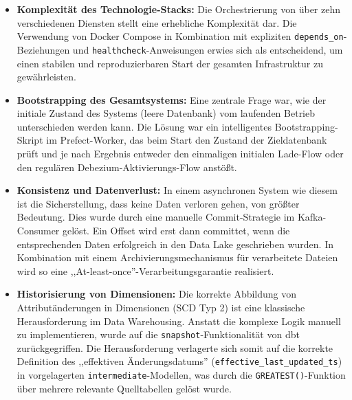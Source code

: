 \documentclass[
    12pt,               
    a4paper,        
    ngerman            
]{scrartcl}
\begin{document}
\begin{itemize}
    \item \textbf{Komplexität des Technologie-Stacks:} Die Orchestrierung von über zehn verschiedenen Diensten stellt eine erhebliche Komplexität dar. Die Verwendung von Docker Compose in Kombination mit expliziten \texttt{depends\_on}-Beziehungen und \texttt{healthcheck}-Anweisungen erwies sich als entscheidend, um einen stabilen und reproduzierbaren Start der gesamten Infrastruktur zu gewährleisten.

    \item \textbf{Bootstrapping des Gesamtsystems:} Eine zentrale Frage war, wie der initiale Zustand des Systems (leere Datenbank) vom laufenden Betrieb unterschieden werden kann. Die Lösung war ein intelligentes Bootstrapping-Skript im Prefect-Worker, das beim Start den Zustand der Zieldatenbank prüft und je nach Ergebnis entweder den einmaligen initialen Lade-Flow oder den regulären Debezium-Aktivierungs-Flow anstößt.

    \item \textbf{Konsistenz und Datenverlust:} In einem asynchronen System wie diesem ist die Sicherstellung, dass keine Daten verloren gehen, von größter Bedeutung. Dies wurde durch eine manuelle Commit-Strategie im Kafka-Consumer gelöst. Ein Offset wird erst dann committet, wenn die entsprechenden Daten erfolgreich in den Data Lake geschrieben wurden. In Kombination mit einem Archivierungsmechanismus für verarbeitete Dateien wird so eine ,,At-least-once''-Verarbeitungsgarantie realisiert.

    \item \textbf{Historisierung von Dimensionen:} Die korrekte Abbildung von Attributänderungen in Dimensionen (SCD Typ 2) ist eine klassische Herausforderung im Data Warehousing. Anstatt die komplexe Logik manuell zu implementieren, wurde auf die \texttt{snapshot}-Funktionalität von dbt zurückgegriffen. Die Herausforderung verlagerte sich somit auf die korrekte Definition des ,,effektiven Änderungsdatums'' (\texttt{effective\_last\_updated\_ts}) in vorgelagerten \texttt{intermediate}-Modellen, was durch die \texttt{GREATEST()}-Funktion über mehrere relevante Quelltabellen gelöst wurde.
\end{itemize}
\end{document}
